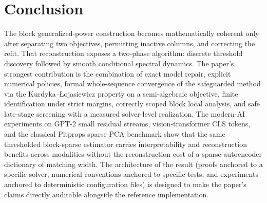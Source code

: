 \section{Conclusion}
\label{sec:conclusion}
The block generalized-power construction becomes mathematically coherent only after separating two objectives, permitting inactive columns, and correcting the refit. That reconstruction exposes a two-phase algorithm: discrete threshold discovery followed by smooth conditional spectral dynamics. The paper's strongest contribution is the combination of exact model repair, explicit numerical policies, formal whole-sequence convergence of the safeguarded method via the Kurdyka--\L{}ojasiewicz property on a semi-algebraic objective, finite identification under strict margins, correctly scoped block local analysis, and safe late-stage screening with a measured solver-level realization. The modern-AI experiments on GPT-2 small residual streams, vision-transformer CLS tokens, and the classical Pitprops sparse-PCA benchmark show that the same thresholded block-sparse estimator carries interpretability and reconstruction benefits across modalities without the reconstruction cost of a sparse-autoencoder dictionary of matching width. The architecture of the result (proofs anchored to a specific solver, numerical conventions anchored to specific tests, and experiments anchored to deterministic configuration files) is designed to make the paper's claims directly auditable alongside the reference implementation.
